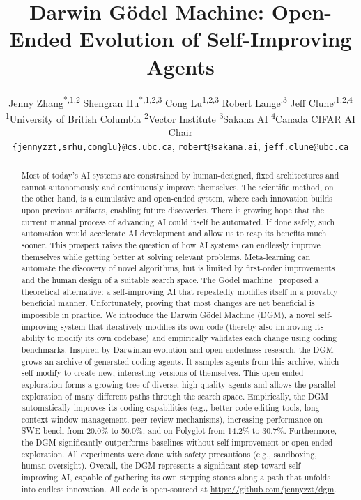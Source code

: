 \documentclass{article} %
\title{Darwin G\"odel Machine: Open-Ended Evolution of Self-Improving Agents}
\author{%
Jenny Zhang\textsuperscript{*,1,2} \quad
Shengran Hu\textsuperscript{*,1,2,3} \quad
Cong Lu\textsuperscript{1,2,3} \quad
Robert Lange\textsuperscript{\dag,3} \quad
Jeff Clune\textsuperscript{\dag,1,2,4}
\\
\textsuperscript{1}University of British Columbia \quad
\textsuperscript{2}Vector Institute \quad
\textsuperscript{3}Sakana AI \quad
\textsuperscript{4}Canada CIFAR AI Chair
\\
\texttt{\{jennyzzt,srhu,conglu\}@cs.ubc.ca}, \texttt{robert@sakana.ai}, \texttt{jeff.clune@ubc.ca}
}
\begin{document}
\renewcommand{\thefootnote}{\fnsymbol{footnote}}
\renewcommand{\thefootnote}{\arabic{footnote}}

\maketitle

\begin{abstract}
Most of today's AI systems are constrained by human-designed, fixed architectures and cannot autonomously and continuously improve themselves. The scientific method, on the other hand, is a cumulative and open-ended system, where each innovation builds upon previous artifacts, enabling future discoveries. There is growing hope that the current manual process of advancing AI could itself be automated. If done safely, such automation would accelerate AI development and allow us to reap its benefits much sooner. This prospect raises the question of how AI systems can endlessly improve themselves while getting better at solving relevant problems. Meta-learning can automate the discovery of novel algorithms, but is limited by first-order improvements and the human design of a suitable search space. The G\"odel machine~\citep{schmidhuber2007godel} proposed a theoretical alternative: a self-improving AI that repeatedly modifies itself in a provably beneficial manner. Unfortunately, proving that most changes are net beneficial is impossible in practice. We introduce the Darwin G\"odel Machine (DGM), a novel self-improving system that iteratively modifies its own code (thereby also improving its ability to modify its own codebase) and empirically validates each change using coding benchmarks. Inspired by Darwinian evolution and open-endedness research, the DGM grows an archive of generated coding agents. It samples agents from this archive, which self-modify to create new, interesting versions of themselves. This open-ended exploration forms a growing tree of diverse, high-quality agents and allows the parallel exploration of many different paths through the search space. Empirically, the DGM automatically improves its coding capabilities (e.g., better code editing tools, long-context window management, peer-review mechanisms), increasing performance on SWE-bench from 20.0\% to 50.0\%, and on Polyglot from 14.2\% to 30.7\%. Furthermore, the DGM significantly outperforms baselines without self-improvement or open-ended exploration. All experiments were done with safety precautions (e.g., sandboxing, human oversight). Overall, the DGM represents a significant step toward self-improving AI, capable of gathering its own stepping stones along a path that unfolds into endless innovation.
All code is open-sourced at \href{https://github.com/jennyzzt/dgm}{https://github.com/jennyzzt/dgm}.
\end{abstract}
\end{document}
